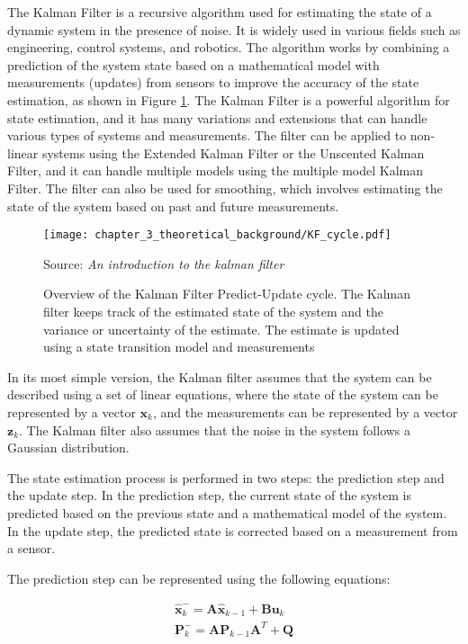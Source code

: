 The Kalman Filter \cite{kalman1960new} is a recursive algorithm used for estimating the state of a dynamic system in the presence of noise. It is widely used in various fields such as engineering, control systems, and robotics. The algorithm works by combining a prediction of the system state based on a mathematical model with measurements (updates) from sensors to improve the accuracy of the state estimation, as shown in Figure \ref{fig:chapter_3_theoretical_background/KF_cycle}. The Kalman Filter is a powerful algorithm for state estimation, and it has many variations and extensions that can handle various types of systems and measurements. The filter can be applied to non-linear systems using the Extended Kalman Filter or the Unscented Kalman Filter, and it can handle multiple models using the multiple model Kalman Filter. The filter can also be used for smoothing, which involves estimating the state of the system based on past and future measurements.

\begin{figure}[h]
	\centering
	\texttt{[image: chapter\_3\_theoretical\_background/KF\_cycle.pdf]}
	\caption[Overview of the Kalman Filter Predict-Update cycle]{Overview of the Kalman Filter Predict-Update cycle. The Kalman filter keeps track of the estimated state of the system and the variance or uncertainty of the estimate. The estimate is updated using a state transition model and measurements}
	Source: \textit{An introduction to the kalman filter} \cite{bishop2001introduction}
	\label{fig:chapter_3_theoretical_background/KF_cycle}
\end{figure}

In its most simple version, the Kalman filter assumes that the system can be described using a set of linear equations, where the state of the system can be represented by a vector $\mathbf{x}_k$, and the measurements can be represented by a vector $\mathbf{z}_k$. The Kalman filter also assumes that the noise in the system follows a Gaussian distribution.

The state estimation process is performed in two steps: the prediction step and the update step. In the prediction step, the current state of the system is predicted based on the previous state and a mathematical model of the system. In the update step, the predicted state is corrected based on a measurement from a sensor.

The prediction step can be represented using the following equations:

\begin{equation}
\begin{split}
	\hat{\mathbf{x}}_k^- = \mathbf{A} \hat{\mathbf{x}}_{k-1} + \mathbf{B} \mathbf{u}_k \\
	\mathbf{P}_k^- = \mathbf{A} \mathbf{P}_{k-1} \mathbf{A}^T + \mathbf{Q}
\end{split}
\end{equation}

